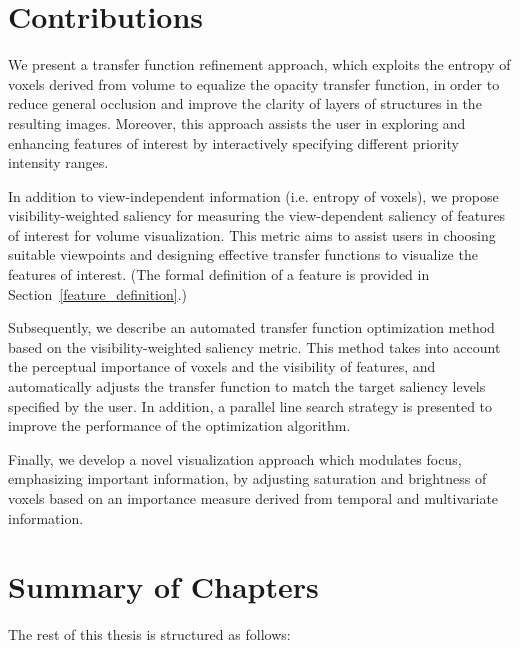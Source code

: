 
\section{Contributions}
We present a transfer function refinement approach, which exploits the entropy of voxels derived from volume to equalize the opacity transfer function, in order to reduce general occlusion and improve the clarity of layers of structures in the resulting images.
Moreover, this approach assists the user in exploring and enhancing features of interest by interactively specifying different priority intensity ranges.

In addition to view-independent information (i.e. entropy of voxels), we propose visibility-weighted saliency for measuring the view-dependent saliency of features of interest for volume visualization.
This metric aims to assist users in choosing suitable viewpoints and designing effective transfer functions to visualize the features of interest.
(The formal definition of a feature is provided in Section~\ref{feature_definition}.)

Subsequently, we describe an automated transfer function optimization method based on the visibility-weighted saliency metric. This method takes into account the perceptual importance of voxels and the visibility of features, and automatically adjusts the transfer function to match the target saliency levels specified by the user. In addition, a parallel line search strategy is presented to improve the performance of the optimization algorithm.

Finally, we develop a novel visualization approach which modulates focus, emphasizing important information, by adjusting saturation and brightness of voxels based on an importance measure derived from temporal and multivariate information.

\section{Summary of Chapters}
The rest of this thesis is structured as follows:

